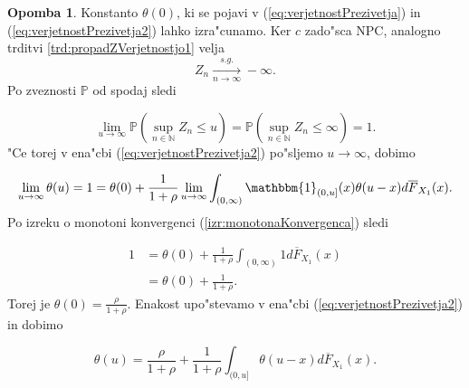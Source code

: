 \documentclass[12pt, a4paper, reqno]{amsart}
\theoremstyle{definition}
\newtheorem{opomba}[definicija]{Opomba}
\theoremstyle{plain}
\newcommand{\N}{\mathbb{N}}
\newcommand{\E}{\mathbb{E}}
\newcommand{\Prob}{\mathbb{P}}
\newcommand{\1}{\mathds{1}}
\begin{document}
            \begin{opomba}
                Konstanto $\theta(0)$, ki se pojavi v (\ref{eq:verjetnostPrezivetja}) in 
                (\ref{eq:verjetnostPrezivetja2}) lahko izra"cunamo. Ker $c$ zado"sca NPC, analogno trditvi 
                \ref{trd:propadZVerjetnostjo1} velja 
                \begin{equation*}
                    Z_n \xrightarrow[n\to\infty]{s.g.} -\infty.
                \end{equation*}
                Po zveznosti $\Prob$ od spodaj sledi

                \begin{equation*}
                    \lim_{u\to\infty}\Prob\left(\sup_{n\in\N}Z_n \leq u\right) = \Prob\left(\sup_{n\in\N}Z_n \leq \infty\right) = 1.
                \end{equation*}
                "Ce torej v ena"cbi (\ref{eq:verjetnostPrezivetja2}) po"sljemo $u\to\infty$, dobimo

                \begin{equation*}
                    \lim_{u\to\infty}\theta(u) = 1 = \theta(0) + \frac{1}{1 + \rho}\lim_{u\to\infty}\int_{(0, \infty)}\mathbbm{1}_{(0, u]}(x)\theta(u - x)d\overline{F}_{X_1}(x). \\
                \end{equation*}
                Po izreku o monotoni konvergenci (\ref{izr:monotonaKonvergenca}) sledi

                \begin{align*}
                    1 &= \theta(0) + \frac{1}{1 + \rho}\int_{(0, \infty)}1d\overline{F}_{X_1}(x) \\
                     &= \theta(0) + \frac{1}{1 + \rho}.
                \end{align*}
                Torej je $\theta(0) = \frac{\rho}{1 + \rho}$.
                Enakost upo"stevamo v ena"cbi (\ref{eq:verjetnostPrezivetja2}) in dobimo

                \begin{equation}
                    \theta(u) = \frac{\rho}{1 + \rho} + \frac{1}{1 + \rho}\int_{(0, u]}\theta(u - x)d\overline{F}_{X_1}(x).
                    \label{eq:verjetnostPrezivetja3}
                \end{equation}

                \label{op:verjetnostPrezivetja2}
            \end{opomba}
\end{document}
